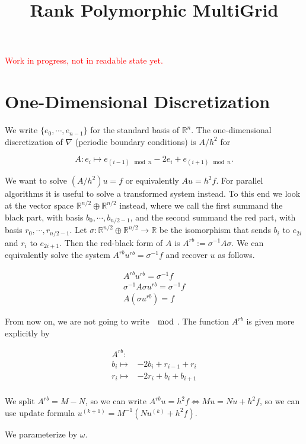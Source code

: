 \documentclass{article}
\title{Rank Polymorphic MultiGrid}
\begin{document}
\textcolor{red}{Work in progress, not in readable state yet.}

\section{One-Dimensional Discretization}

We write $\{e_0, \cdots, e_{n - 1}\}$ for the standard basis of $\mathbb{R}^n$.
The one-dimensional discretization of $\nabla$ (periodic boundary conditions)
is $A / h^2$ for

\[
A: e_{i} \mapsto e_{(i - 1) \mod n} - 2 e_{i} + e_{(i + 1) \mod n}.
\]

We want to solve $(A / h^2)u = f$ or equivalently $Au = h^2 f$. For parallel
algorithms it is useful to solve a transformed system instead. To this end
we look at the vector space $\mathbb{R}^{n / 2} \oplus \mathbb{R}^{n / 2}$
instead, where we call the first summand the black part, with basis
$b_0, \cdots, b_{n / 2 - 1}$, and the second summand the red part, with
basis $r_0, \cdots, r_{n / 2 - 1}$. Let
$\sigma: \mathbb{R}^{n / 2} \oplus \mathbb{R}^{n / 2} \to \mathbb{R}$ be
the isomorphism that sends $b_i$ to $e_{2i}$ and $r_i$ to $e_{2i + 1}$.
Then the red-black form of $A$ is $A^{rb} := \sigma^{-1} A \sigma$.
We can equivalently solve the system $A^{rb}u^{rb} = \sigma^{-1} f$ and recover
$u$ as follows.

\begin{align*}
    A^{rb}u^{rb} = \sigma^{-1} f \\
    \sigma^{-1} A \sigma u^{rb} = \sigma^{-1} f \\
    A (\sigma u^{rb}) = f
\end{align*}

\newpage

From now on, we are not going to write $\mod$. The function $A^{rb}$ is
given more explicitly by

\begin{align*}
    A^{rb}: & \\
    b_{i} \mapsto & -2b_{i} + r_{i - 1} + r_{i} \\
    r_{i} \mapsto & -2r_{i} + b_{i} + b_{i + 1} \\ 
\end{align*}

We split $A^{rb} = M - N$, so we can write $A^{rb}u = h^2f \iff Mu = Nu + h^2f$,
so we can use update formula $u^{(k + 1)} = M^{-1}(Nu^{(k)} + h^2f)$.

We parameterize by $\omega$.
\end{document}
